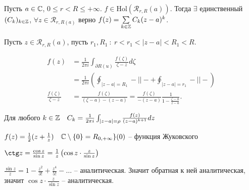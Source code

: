 \begin{statement}
    Пусть $a \in \mathbb{C}$, $0 \leqslant r < R \leqslant +\infty$.
    $f \in \mathrm{Hol} \left( \mathcal {R}_{r, R} (a) \right)$. Тогда $\exists$ единственный $(C_k)_{k\in \mathbb{Z}}$, $\forall z \in \mathcal{R}_{r, R (a)}$ верно $f(z) = \sum_{k\in \Z} C_k (z - a)^k$.


    Пусть $z \in \mathcal{R} _{r, R} (a)$, пусть $r_1, R_1 ~:~
    r < r_1 < |z - a| < R_1 < R$.

    \begin{align*}
        f(z) &= \frac{1}{2\pi i} \int_{\partial R(u)} \frac{f(\zeta)}{\zeta - z} d\zeta\\
        &= \frac{1}{2\pi i} \left( \oint_{|z-a| = R_1} -||- + \oint_{|z-a| = r_1} -||- \right) \\
        \frac{f(\zeta)}{\zeta - z} &= \frac{f(\zeta)}{(\zeta - a) - (z-a)} = \frac{f(\zeta)}{-(z-a)} \frac{1}{1 - \frac{\zeta - a }{z - a}}.
\end{align*}

    Для любого $k\in \mathbb{Z} \quad C_k = \frac{1}{2\pi i} \int_{|z-a| = \rho} \frac{f(z)}{(z-a)^{k+1}}dz$
\end{statement}

\begin{example}
    $f(z) = \frac{1}{2}(z + \frac{1}{z})\quad \mathbb{C}\setminus \{0\} = R_{0, +\infty }\}(0)$ -- функция Жуковского

    $\ctg z = \frac{\cos z}{\sin z} = \frac{1}{z} \left( \cos z \cdot \frac{z}{\sin z} \right) $

    $\frac{\sin z}{z} = 1 - \frac{z^2}{3!} + \frac{z^4}{5!} - \ldots$ -- аналитическая. Значит обратная к ней аналитическая, значит $\cos z \cdot \frac{z}{\sin z}$ -- аналитическая.
\end{example}
